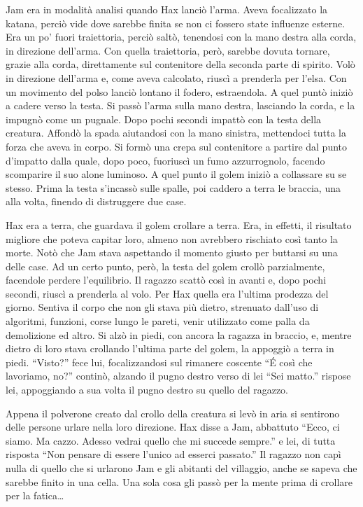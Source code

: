     Jam era in modalità analisi quando Hax lanciò l'arma. Aveva focalizzato
    la katana, perciò vide dove sarebbe finita se non ci fossero state
    influenze esterne. Era un po' fuori traiettoria, perciò saltò,
    tenendosi con la mano destra alla corda, in direzione dell'arma.
    Con quella traiettoria, però, sarebbe dovuta tornare, grazie alla
    corda, direttamente sul contenitore della seconda parte di spirito.
    Volò in direzione dell'arma e, come aveva calcolato, riuscì a prenderla
    per l'elsa. Con un movimento del polso lanciò lontano il fodero,
    estraendola. A quel puntò iniziò a cadere verso la testa. Si passò
    l'arma sulla mano destra, lasciando la corda, e la impugnò come un
    pugnale. Dopo pochi secondi impattò con la testa della creatura.
    Affondò la spada aiutandosi con la mano sinistra, mettendoci tutta la
    forza che aveva in corpo. Si formò una crepa sul contenitore a partire
    dal punto d'impatto dalla quale, dopo poco, fuoriuscì un fumo
    azzurrognolo, facendo scomparire il suo alone luminoso. A quel punto il
    golem iniziò a collassare su se stesso. Prima la testa s'incassò sulle
    spalle, poi caddero a terra le braccia, una alla volta, finendo di
    distruggere due case.

    Hax era a terra, che guardava il golem crollare a terra. Era, in
    effetti, il risultato migliore che poteva capitar loro, almeno non
    avrebbero rischiato così tanto la morte. Notò che Jam stava aspettando
    il momento giusto per buttarsi su una delle case. Ad un certo punto,
    però, la testa del golem crollò parzialmente, facendole perdere
    l'equilibrio. Il ragazzo scattò così in avanti e, dopo pochi secondi,
    riuscì a prenderla al volo. Per Hax quella era l'ultima prodezza del
    giorno. Sentiva il corpo che non gli stava più dietro, strenuato
    dall'uso di algoritmi, funzioni, corse lungo le pareti, venir
    utilizzato come palla da demolizione ed altro. Si alzò in piedi, con
    ancora la ragazza in braccio, e, mentre dietro di loro stava crollando
    l'ultima parte del golem, la appoggiò a terra in piedi. ``Visto?'' fece
    lui, focalizzandosi sul rimanere coscente ``\'E così che lavoriamo,
    no?'' continò, alzando il pugno destro verso di lei ``Sei matto.''
    rispose lei, appoggiando a sua volta il pugno destro su quello del
    ragazzo.

    Appena il polverone creato dal crollo della creatura si levò in aria si
    sentirono delle persone urlare nella loro direzione. Hax disse a Jam,
    abbattuto ``Ecco, ci siamo. Ma cazzo. Adesso vedrai quello che mi
    succede sempre.'' e lei, di tutta risposta ``Non pensare di essere
    l'unico ad esserci passato.'' Il ragazzo non capì nulla di quello che
    si urlarono Jam e gli abitanti del villaggio, anche se sapeva che
    sarebbe finito in una cella. Una sola cosa gli passò per la mente prima
    di crollare per la fatica\dots{}

